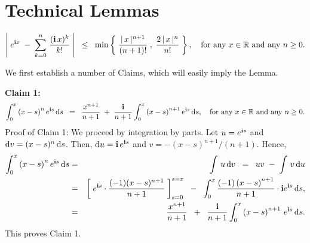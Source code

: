

\section{Technical Lemmas}
\setcounter{theorem}{0}
\setcounter{equation}{0}

\renewcommand{\theenumi}{\alph{enumi}}
\renewcommand{\labelenumi}{\textnormal{(\theenumi)}$\;\;$}

\begin{lemma}
\label{BillingsleyThreeFourThree}
\mbox{}\vskip 0.2cm
\noindent
\begin{equation*}
\left\vert\;e^{\textnormal{\bf i} x} \;-\; \sum_{k = 0}^{n}\,\dfrac{(\textnormal{\bf i}\,x)^{k}}{k!} \;\right\vert
\;\;\leq\;\;
\min\left\{\;\dfrac{\vert\,x\,\vert^{n+1}}{(n+1)!}\;,\;\dfrac{2\,\vert\,x\,\vert^{n}}{n!}\;\right\},
\quad
\textnormal{for any $x \in \mathbb{R}$ and any $n \geq 0$.}
\end{equation*}
\end{lemma}
\proof
We first establish a number of Claims, which will easily imply the Lemma.
\begin{center}
\begin{minipage}{6.5in}
\noindent
\textbf{Claim 1:}
\begin{equation*}
\int_{0}^{x}\left(x-s\right)^{n}e^{\textnormal{\bf i} s}\,\textnormal{d} s
\;\;=\;\;
\dfrac{x^{n+1}}{n+1} \;+\; \dfrac{\textnormal{\bf i}}{n+1}\int_{0}^{x}\left(x-s\right)^{n+1}e^{\textnormal{\bf i} s}\,\textnormal{d} s,
\quad
\textnormal{for any $x \in \mathbb{R}$ and any $n \geq 0$.}
\end{equation*}
Proof of Claim 1: We proceed by integration by parts.
Let $u = e^{\textnormal{\bf i} s}$ and $\textnormal{d} v = (x-s)^{n}\,\textnormal{d} s$.
Then, $\textnormal{d} u = \textnormal{\bf i}\,e^{\textnormal{\bf i} s}$ and $v = -(x-s)^{n+1}/(n+1)$.
Hence,
\begin{eqnarray*}
\int_{0}^{x}\left(x-s\right)^{n}e^{\textnormal{\bf i} s}\,\textnormal{d} s
&=& \int\,u\,\textnormal{d} v
\;\;=\;\; uv \; - \; \int\,v\,\textnormal{d} u
\\
&=&
\left[\;e^{\textnormal{\bf i} s}\cdot\dfrac{(-1)(x-s)^{n+1}}{n+1}\;\right]_{s=0}^{s=x}
\;\; - \;\; \int_{0}^{x}\dfrac{(-1)\left(x-s\right)^{n+1}}{n+1}\cdot\textnormal{\bf i} e^{\textnormal{\bf i} s}\,\textnormal{d} s,
\\
&=&
\dfrac{x^{n+1}}{n+1} \;\; + \;\; \dfrac{\textnormal{\bf i}}{n+1}\int_{0}^{x}\left(x-s\right)^{n+1}\,e^{\textnormal{\bf i} s}\,\textnormal{d} s.
\end{eqnarray*}
This proves Claim 1.
\end{minipage}
\end{center}


